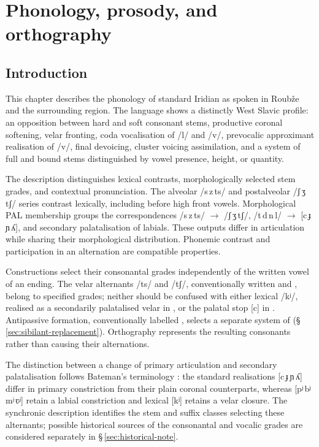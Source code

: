 \chapter{Phonology, prosody, and orthography}\label{ch:phon}

\section{Introduction}

This chapter describes the phonology of standard Iridian as spoken in Roubže and the
surrounding region. The language shows a distinctly West Slavic profile: an
opposition between hard and soft consonant stems, productive coronal softening,
velar fronting, coda vocalisation of /l/ and /v/, prevocalic approximant realisation
of /v/, final devoicing, cluster voicing assimilation, and a system of
full and bound stems distinguished by vowel presence, height, or quantity.

The description distinguishes lexical contrasts, morphologically selected stem
grades, and contextual pronunciation. The alveolar /s\,z\,ts/ and
postalveolar /ʃ\,ʒ\,tʃ/ series contrast lexically, including before high
front vowels. Morphological PAL membership groups the correspondences
/s\,z\,ts/ $\rightarrow$ /ʃ\,ʒ\,tʃ/, /t\,d\,n\,l/ $\rightarrow$
[c\,ɟ\,ɲ\,ʎ], and secondary palatalisation of labials. These outputs
differ in articulation while sharing their morphological distribution.
Phonemic contrast and participation in an alternation are compatible
properties.

Constructions select their consonantal grades independently of the written vowel
of an ending. The velar alternants /ts/ and /tʃ/, conventionally written
 and , belong to specified grades; neither should be confused
with either lexical /kʲ/, realised as a secondarily palatalised velar in
, or the palatal stop [c] in . Antipassive
formation, conventionally labelled , selects a separate system
of 
(§\,\ref{sec:sibilant-replacement}). Orthography represents the resulting
consonants rather than causing their alternations.

The distinction between a change of primary articulation and secondary
palatalisation follows Bateman’s terminology \cite{bateman2007}: the standard
realisations [c\,ɟ\,ɲ\,ʎ] differ in primary constriction from their plain
coronal counterparts, whereas [pʲ\,bʲ\,mʲ\,ʋʲ] retain a labial constriction
and lexical [kʲ] retains a velar closure.
The synchronic description identifies the stem and suffix classes selecting
these alternants; possible historical sources of the consonantal and vocalic
grades are considered separately in §\,\ref{sec:historical-note}.

